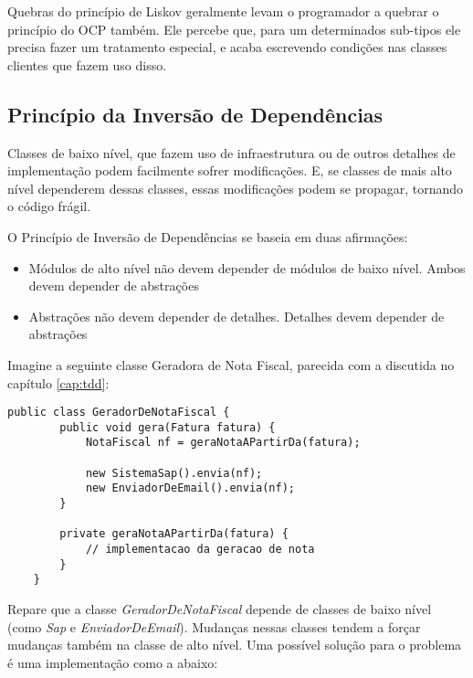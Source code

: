 Quebras do princípio de Liskov geralmente levam o programador a quebrar o
princípio do OCP também. Ele percebe que, para um determinados sub-tipos ele 
precisa fazer um tratamento especial, e acaba escrevendo condições nas classes 
clientes que fazem uso disso.

\subsection{Princípio da Inversão de Dependências}
\label{subsec:dip}

Classes de baixo nível, que fazem uso de infraestrutura ou de outros detalhes
de implementação podem facilmente sofrer modificações. E, se classes de mais alto
nível dependerem dessas classes, essas modificações podem se propagar, tornando
o código frágil.

O Princípio de Inversão de Dependências se baseia em duas afirmações:

\begin{itemize}
	\item Módulos de alto nível não devem depender de módulos de baixo nível. 
	Ambos devem depender de abstrações
	\item Abstrações não devem depender de detalhes. Detalhes devem depender de
	abstrações
\end{itemize}

Imagine a seguinte classe Geradora de Nota Fiscal, parecida com a discutida no
capítulo \ref{cap:tdd}:

\begin{lstlisting}[frame=trbl]
	public class GeradorDeNotaFiscal {
		public void gera(Fatura fatura) {
			NotaFiscal nf = geraNotaAPartirDa(fatura);
			
			new SistemaSap().envia(nf);
			new EnviadorDeEmail().envia(nf);
		}
		
		private geraNotaAPartirDa(fatura) {
			// implementacao da geracao de nota
		}
	}
\end{lstlisting}

Repare que a classe \textit{GeradorDeNotaFiscal} depende de classes de baixo
nível (como \textit{Sap} e \textit{EnviadorDeEmail}). Mudanças nessas classes
tendem a forçar mudanças também na classe de alto nível. Uma possível solução para o problema é
uma implementação como a abaixo:

